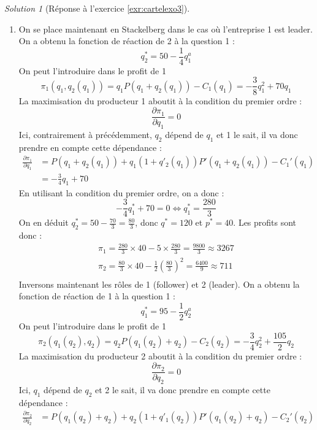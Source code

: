\documentclass[
]{book}
\theoremstyle{definition}
\theoremstyle{definition}
\theoremstyle{definition}
\theoremstyle{definition}
\theoremstyle{remark}
\newtheorem*{solution}{Solution}
\begin{document}
\begin{solution}[Réponse à l'exercice \ref{exr:cartelexo3}]
\begin{enumerate}
\begin{align*}
  \end{align*}
  La quantité totale échangée sur le marché est donc \(q^*=110\).
  On en déduit que le prix est \(p^*=45\).
  On calcule aussi les profits (cela sera utile plus tard dans l'exercice).
  \begin{align*}
  \pi_1&=80\times 45-5\times 80=3200\\
  \pi_2&=30\times 45-\frac{1}{2}30^2=900
  \end{align*}
\item
  On se place maintenant en Stackelberg dans le cas où l'entreprise 1 est leader.
  On a obtenu la fonction de réaction de 2 à la question 1 :
  \[
  q_2^*=50-\frac{1}{4}q_1^a
  \]
  On peut l'introduire dans le profit de 1
  \[\pi_1(q_1, q_2(q_1))=q_1P(q_1+q_2(q_1))-C_1(q_1)=-\frac{3}{8}q_1^2+70q_1\]
  La maximisation du producteur 1 aboutit à la condition du premier ordre :
  \[\frac{\partial \pi_1}{\partial q_1}=0\]
  Ici, contrairement à précédemment, \(q_2\) dépend de \(q_1\) et 1 le sait, il va donc prendre en compte cette dépendance :
  \begin{align*}
  \frac{\partial \pi_1}{\partial q_1}&=P(q_1+ q_2(q_1))+q_1(1+q'_2(q_1))P'(q_1+q_2(q_1))-C_1'(q_1)\\
  &=-\frac{3}{4}q_1+70
  \end{align*}
  En utilisant la condition du premier ordre, on a donc :
  \[-\frac{3}{4}q_1^*+70=0\Leftrightarrow q_1^*=\frac{280}{3}\]
  On en déduit \(q_2^*=50-\frac{70}{3}=\frac{80}{3}\), donc \(q^*=120\) et \(p^*=40\).
  Les profits sont donc :
  \begin{gather*}
  \pi_1=\frac{280}{3}\times 40-5\times\frac{280}{3}=\frac{9800}{3}\approx 3267\\
  \pi_2=\frac{80}{3}\times 40-\frac{1}{2}\left(\frac{80}{3}\right)^2=\frac{6400}{9}\approx 711\\
  \end{gather*}
  Inversons maintenant les rôles de 1 (follower) et 2 (leader).
  On a obtenu la fonction de réaction de 1 à la question 1 :
  \[
  q_1^*=95-\frac{1}{2}q_2^a
  \]
  On peut l'introduire dans le profit de 1
  \[\pi_2(q_1(q_2), q_2)=q_2P(q_1(q_2)+q_2)-C_2(q_2)=-\frac{3}{4}q_2^2+\frac{105}{2}q_2\]
  La maximisation du producteur 2 aboutit à la condition du premier ordre :
  \[\frac{\partial \pi_2}{\partial q_2}=0\]
  Ici, \(q_1\) dépend de \(q_2\) et 2 le sait, il va donc prendre en compte cette dépendance :
  \begin{align*}
  \frac{\partial \pi_2}{\partial q_2}&=P(q_1(q_2)+ q_2)+q_2(1+q'_1(q_2))P'(q_1(q_2)+q_2)-C_2'(q_2)\\

\end{align*}
\end{enumerate}
\end{solution}
\end{document}

